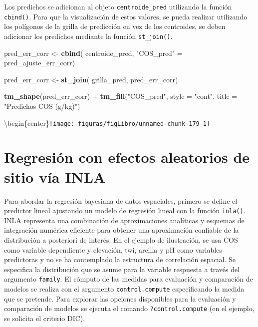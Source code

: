 \documentclass[11pt,b5paper,]{krantz}
\newenvironment{Shaded}{}{}
\newcommand{\DataTypeTok}[1]{\textcolor[rgb]{0.56,0.13,0.00}{#1}}
\newcommand{\KeywordTok}[1]{\textcolor[rgb]{0.00,0.44,0.13}{\textbf{#1}}}
\newcommand{\NormalTok}[1]{#1}
\newcommand{\OperatorTok}[1]{\textcolor[rgb]{0.40,0.40,0.40}{#1}}
\newcommand{\StringTok}[1]{\textcolor[rgb]{0.25,0.44,0.63}{#1}}
\begin{document}
Los predichos se adicionan al objeto \texttt{centroide\_pred} utilizando la función \texttt{cbind()}. Para que la visualización de estos valores, se pueda realizar utilizando los polígonos de la grilla de predicción en vez de los centroides, se deben adicionar los predichos mediante la función \texttt{st\_join()}.

\begin{Shaded}
\begin{Highlighting}[]
\NormalTok{pred_err_corr <-}\StringTok{ }\KeywordTok{cbind}\NormalTok{(}
\NormalTok{  centroide_pred,}
  \StringTok{"COS_pred"}\NormalTok{ =}\StringTok{ }\NormalTok{pred_ajuste_err_corr)}

\NormalTok{pred_err_corr <-}\StringTok{ }\KeywordTok{st_join}\NormalTok{(}
\NormalTok{  grilla_pred,}
\NormalTok{  pred_err_corr)}

\KeywordTok{tm_shape}\NormalTok{(pred_err_corr) }\OperatorTok{+}
\StringTok{  }\KeywordTok{tm_fill}\NormalTok{(}\StringTok{"COS_pred"}\NormalTok{, }\DataTypeTok{style =} \StringTok{"cont"}\NormalTok{,}
          \DataTypeTok{title =} \StringTok{"Predichos COS (g/kg)"}\NormalTok{)}
\end{Highlighting}
\end{Shaded}

\textbackslash{}begin\{center\}\texttt{[image: figuras/figLibro/unnamed-chunk-179-1]}

\hypertarget{regresiuxf3n-con-efectos-aleatorios-de-sitio-vuxeda-inla-1}{%
\section{Regresión con efectos aleatorios de sitio vía INLA}\label{regresiuxf3n-con-efectos-aleatorios-de-sitio-vuxeda-inla-1}}

Para abordar la regresión bayesiana de datos espaciales, primero se define el predictor lineal ajustando un modelo de regresión lineal con la función \texttt{inla()}. INLA representa una combinación de aproximaciones analíticas y esquemas de integración numérica eficiente para obtener una aproximación confiable de la distribución a posteriori de interés. En el ejemplo de ilustración, se usa COS como variable dependiente y elevación, twi, arcilla y pH como variables predictoras y no se ha contemplado la estructura de correlación espacial. Se especifica la distribución que se asume para la variable respuesta a través del argumento \texttt{family}. El cómputo de las medidas para evaluación y comparación de modelos se realiza con el argumento \texttt{control.compute} especificando la medida que se pretende. Para explorar las opciones disponibles para la evaluación y comparación de modelos se ejecuta el comando \texttt{?control.compute} (en el ejemplo, se solicita el criterio DIC).
\end{document}
